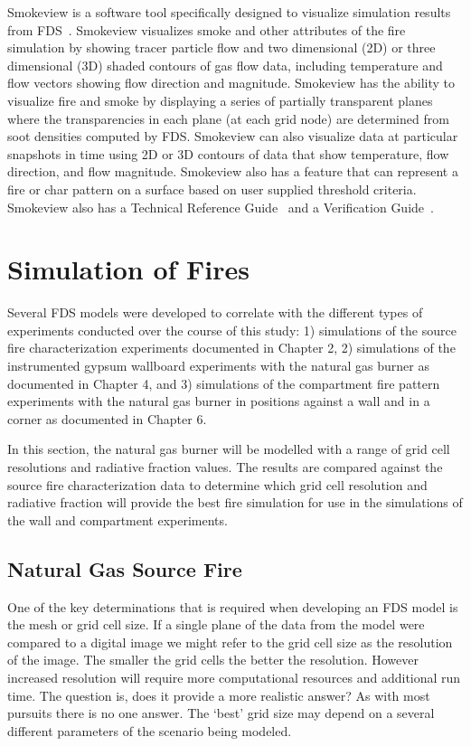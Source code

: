 \documentclass[twoside]{uocthesis}
\begin{document}
{Smokeview is a software tool specifically designed to visualize simulation results from FDS~\cite{Smokeview_Users_Guide}. Smokeview visualizes smoke and other attributes of the fire simulation by showing tracer particle flow and two dimensional (2D) or three dimensional (3D) shaded contours of gas flow data, including temperature and flow vectors showing flow direction and magnitude. Smokeview has the ability to visualize fire and smoke by displaying a series of partially transparent planes where the transparencies in each plane (at each grid node) are determined from soot densities computed by FDS. Smokeview can also visualize data at particular snapshots in time using 2D or 3D contours of data that show temperature, flow direction, and flow magnitude.  Smokeview also has a feature that can represent a fire or char pattern on a surface based on user supplied threshold criteria.  Smokeview also has a Technical Reference Guide~\cite{Smokeview_Tech_Guide} and a Verification Guide~\cite{Smokeview_Verification_Guide}.

\section{Simulation of Fires}

Several FDS models were developed to correlate with the different types of experiments conducted over the course of this study: 1) simulations of the source fire characterization experiments documented in Chapter 2, 2) simulations of the instrumented gypsum wallboard experiments with the natural gas burner as documented in Chapter 4, and 3) simulations of the compartment fire pattern experiments with the natural gas burner in positions against a wall and in a corner as documented in Chapter 6.  

In this section, the natural gas burner will be modelled with a range of grid cell resolutions and radiative fraction values.  The results are compared against the source fire characterization data to determine which grid cell resolution and radiative fraction will provide the best fire simulation for use in the simulations of the wall and compartment experiments.      

\subsection{Natural Gas Source Fire}

One of the key determinations that is required when developing an FDS model is the mesh or grid cell size.  If a single plane of the data from the model were compared to a digital image we might refer to the grid cell size as the resolution of the image.  The smaller the grid cells the better the resolution. However increased resolution will require more computational resources and additional run time. The question is, does it provide a more realistic answer?  As with most pursuits there is no one answer.  The `best' grid size may depend on a several different parameters of the scenario being modeled. 

}
\end{document}
